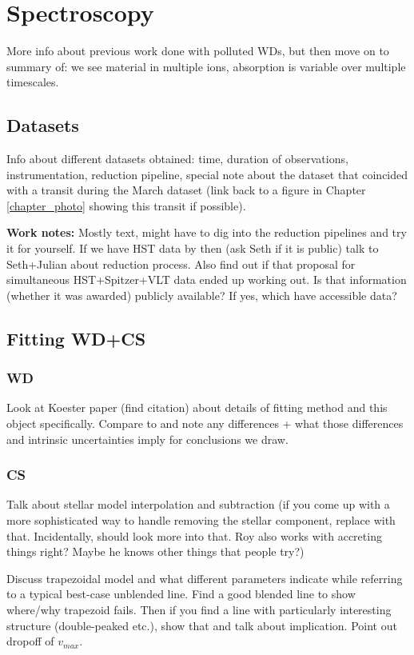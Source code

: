 \chapter{Spectroscopy}
\label{chapter_spectra}


More info about previous work done with polluted WDs, but then move on to summary of: we see material in multiple ions, absorption is variable over multiple timescales.

\section{Datasets}
\label{spectra_datasets}
Info about different datasets obtained: time, duration of observations, instrumentation, reduction pipeline, special note about the dataset that coincided with a transit during the March dataset (link back to a figure in Chapter \ref{chapter_photo} showing this transit if possible).

\textbf{Work notes:} Mostly text, might have to dig into the reduction pipelines and try it for yourself. If we have HST data by then (ask Seth if it is public) talk to Seth+Julian about reduction process. Also find out if that proposal for simultaneous HST+Spitzer+VLT data ended up working out. Is that information (whether it was awarded) publicly available? If yes, which have accessible data?

\section{Fitting WD+CS}
\label{spectra_fitting}
\subsection{WD}
Look at Koester paper (find citation) about details of fitting method and this object specifically. Compare to \cite{Xu2016} and note any differences + what those differences and intrinsic uncertainties imply for conclusions we draw.

\subsection{CS}
Talk about stellar model interpolation and subtraction (if you come up with a more sophisticated way to handle removing the stellar component, replace with that. Incidentally, should look more into that. Roy also works with accreting things right? Maybe he knows other things that people try?)

Discuss trapezoidal model and what different parameters indicate while referring to a typical best-case unblended line. Find a good blended line to show where/why trapezoid fails. Then if you find a line with particularly interesting structure (double-peaked etc.), show that and talk about implication. Point out dropoff of $v_{max}$. 

